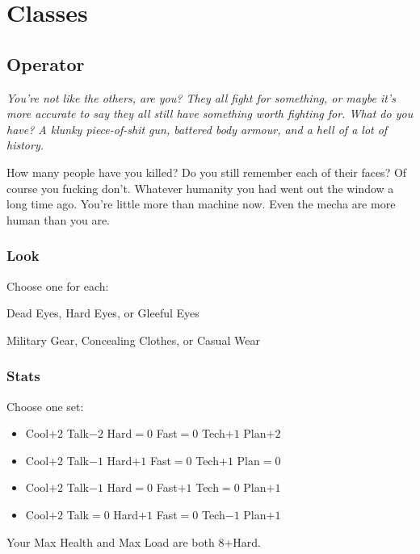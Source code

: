 \section{Classes}

\subsection{Operator}
{\itshape You're not like the others, are you? They all fight for
  something, or maybe it's more accurate to say they all still have
  something worth fighting for. What do you have? A klunky
  piece-of-shit gun, battered body armour, and a hell of a lot of
  history.

How many people have you killed? Do you still remember each of their
faces? Of course you fucking don't. Whatever humanity you had went out
the window a long time ago. You're little more than machine now. Even
the mecha are more human than you are.}

\subsubsection{Look}

Choose one for each:

Dead Eyes, Hard Eyes, or Gleeful Eyes

Military Gear, Concealing Clothes, or Casual Wear

\subsubsection{Stats}
Choose one set:
\begin{itemize}
\setlength\itemsep{0em}
\item Cool$+2$ Talk$-2$ Hard${=}0$ Fast${=}0$ Tech$+1$ Plan$+2$
\item Cool$+2$ Talk$-1$ Hard$+1$ Fast${=}0$ Tech$+1$ Plan${=}0$
\item Cool$+2$ Talk$-1$ Hard${=}0$ Fast$+1$ Tech${=}0$ Plan$+1$
\item Cool$+2$ Talk${=}0$ Hard$+1$ Fast${=}0$ Tech$-1$ Plan$+1$
\end{itemize}

Your Max Health and Max Load are both 8+Hard.

